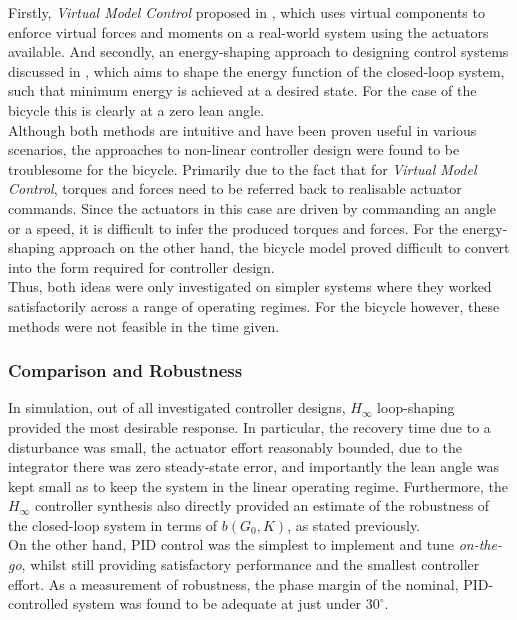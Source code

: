 Firstly, \textit{Virtual Model Control} proposed in \cite{virtualmodel}, which uses virtual components to enforce virtual forces and moments on a real-world system using the actuators available. And secondly, an energy-shaping approach to designing control systems discussed in \cite{puttingenergy}, which aims to shape the energy function of the closed-loop system, such that minimum energy is achieved at a desired state. For the case of the bicycle this is clearly at a zero lean angle. \\

Although both methods are intuitive and have been proven useful in various scenarios, the approaches to non-linear controller design were found to be troublesome for the bicycle. Primarily due to the fact that for \textit{Virtual Model Control}, torques and forces need to be referred back to realisable actuator commands. Since the actuators in this case are driven by commanding an angle or a speed, it is difficult to infer the produced torques and forces. For the energy-shaping approach on the other hand, the bicycle model proved difficult to convert into the form required for controller design.\\

Thus, both ideas were only investigated on simpler systems where they worked satisfactorily across a range of operating regimes. For the bicycle however, these methods were not feasible in the time given.

\subsubsection{Comparison and Robustness}
In simulation, out of all investigated controller designs, $H_{\infty}$ loop-shaping provided the most desirable response. In particular, the recovery time due to a disturbance was small, the actuator effort reasonably bounded, due to the integrator there was zero steady-state error, and importantly the lean angle was kept small as to keep the system in the linear operating regime. Furthermore, the $H_{\infty}$ controller synthesis also directly provided an estimate of the robustness of the closed-loop system in terms of $b(G_0,K)$, as stated previously. \\

On the other hand, PID control was the simplest to implement and tune \textit{on-the-go}, whilst still providing satisfactory performance and the smallest controller effort. As a measurement of robustness, the phase margin of the nominal, PID-controlled system was found to be adequate at just under $30^{\circ}$. \\

